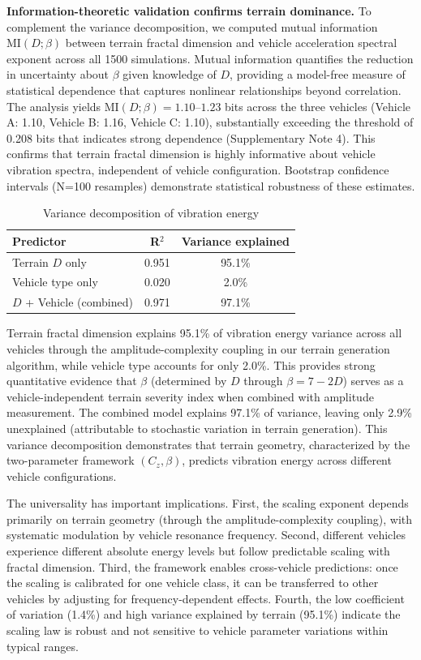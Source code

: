 \documentclass[11pt]{article}
\begin{document}
\textbf{Information-theoretic validation confirms terrain dominance.} To complement the variance decomposition, we computed mutual information $\text{MI}(D;\beta)$ between terrain fractal dimension and vehicle acceleration spectral exponent across all 1500 simulations. Mutual information quantifies the reduction in uncertainty about $\beta$ given knowledge of $D$, providing a model-free measure of statistical dependence that captures nonlinear relationships beyond correlation\cite{Cover2006}. The analysis yields $\text{MI}(D;\beta) = 1.10$--$1.23$ bits across the three vehicles (Vehicle A: 1.10, Vehicle B: 1.16, Vehicle C: 1.10), substantially exceeding the threshold of 0.208 bits that indicates strong dependence (Supplementary Note 4). This confirms that terrain fractal dimension is highly informative about vehicle vibration spectra, independent of vehicle configuration. Bootstrap confidence intervals (N=100 resamples) demonstrate statistical robustness of these estimates.

\begin{table}[h]
\centering
\caption{Variance decomposition of vibration energy}
\begin{tabular}{lcc}
\hline
Predictor & R$^2$ & Variance explained \\
\hline
Terrain $D$ only & 0.951 & 95.1\% \\
Vehicle type only & 0.020 & 2.0\% \\
$D$ + Vehicle (combined) & 0.971 & 97.1\% \\
\hline
\end{tabular}
\label{tab:variance}
\end{table}

Terrain fractal dimension explains 95.1\% of vibration energy variance across all vehicles through the amplitude-complexity coupling in our terrain generation algorithm, while vehicle type accounts for only 2.0\%. This provides strong quantitative evidence that $\beta$ (determined by $D$ through $\beta = 7-2D$) serves as a vehicle-independent terrain severity index when combined with amplitude measurement. The combined model explains 97.1\% of variance, leaving only 2.9\% unexplained (attributable to stochastic variation in terrain generation). This variance decomposition demonstrates that terrain geometry, characterized by the two-parameter framework $(C_z, \beta)$, predicts vibration energy across different vehicle configurations.

The universality has important implications. First, the scaling exponent depends primarily on terrain geometry (through the amplitude-complexity coupling), with systematic modulation by vehicle resonance frequency. Second, different vehicles experience different absolute energy levels but follow predictable scaling with fractal dimension. Third, the framework enables cross-vehicle predictions: once the scaling is calibrated for one vehicle class, it can be transferred to other vehicles by adjusting for frequency-dependent effects. Fourth, the low coefficient of variation (1.4\%) and high variance explained by terrain (95.1\%) indicate the scaling law is robust and not sensitive to vehicle parameter variations within typical ranges.
\end{document}
